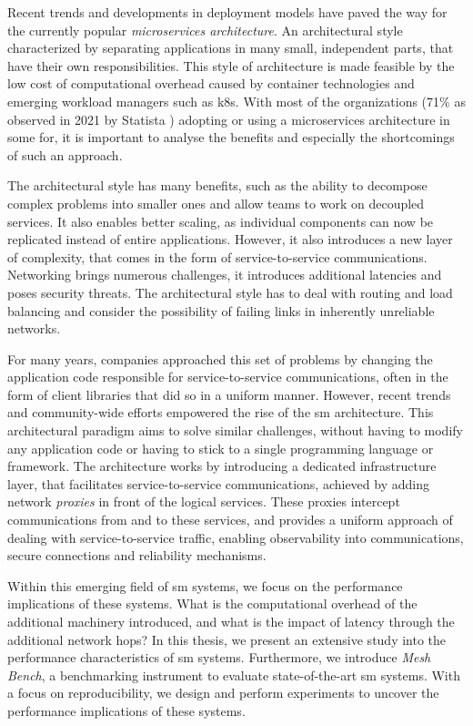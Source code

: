 Recent trends and developments in deployment models have paved the way for the currently popular \textit{microservices architecture}. An architectural style characterized by separating applications in many small, independent parts, that have their own responsibilities. This style of architecture is made feasible by the low cost of computational overhead caused by container technologies and emerging workload managers such as \gls{k8s}. With most of the organizations (71\% as observed in 2021 by Statista \cite{microservices-adoption}) adopting or using a microservices architecture in some for, it is important to analyse the benefits and especially the shortcomings of such an approach.

The architectural style has many benefits, such as the ability to decompose complex problems into smaller ones and allow teams to work on decoupled services. It also enables better scaling, as individual components can now be replicated instead of entire applications. However, it also introduces a new layer of complexity, that comes in the form of service-to-service communications. Networking brings numerous challenges, it introduces additional latencies and poses security threats. The architectural style has to deal with routing and load balancing and consider the possibility of failing links in inherently unreliable networks.

For many years, companies approached this set of problems by changing the application code responsible for service-to-service communications, often in the form of client libraries that did so in a uniform manner. However, recent trends and community-wide efforts empowered the rise of the \gls{sm} architecture. This architectural paradigm aims to solve similar challenges, without having to modify any application code or having to stick to a single programming language or framework. The architecture works by introducing a dedicated infrastructure layer, that facilitates service-to-service communications, achieved by adding network \textit{proxies} in front of the logical services. These proxies intercept communications from and to these services, and provides a uniform approach of dealing with service-to-service traffic, enabling observability into communications, secure connections and reliability mechanisms. 

Within this emerging field of \gls{sm} systems, we focus on the performance implications of these systems. What is the computational overhead of the additional machinery introduced, and what is the impact of latency through the additional network hops? In this thesis, we present an extensive study into the performance characteristics of \gls{sm} systems. Furthermore, we introduce \textit{Mesh Bench}, a benchmarking instrument to evaluate state-of-the-art \gls{sm} systems. With a focus on reproducibility, we design and perform experiments to uncover the performance implications of these systems.

